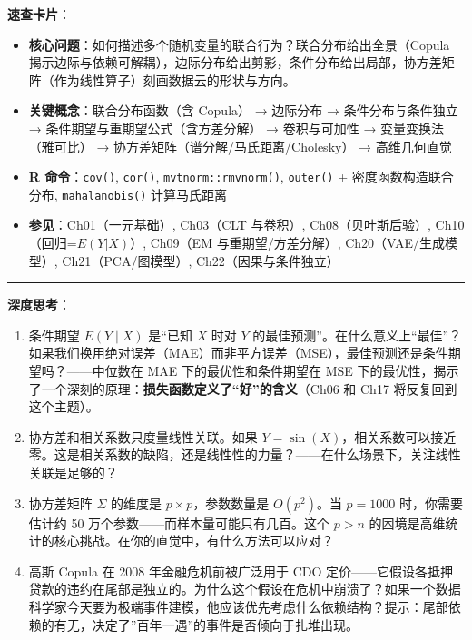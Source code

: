 \documentclass[
]{book}
\providecommand{\tightlist}{%
  \setlength{\itemsep}{0pt}\setlength{\parskip}{0pt}}
\begin{document}
\textbf{速查卡片}：

\begin{itemize}
\tightlist
\item
  \textbf{核心问题}：如何描述多个随机变量的联合行为？联合分布给出全景（Copula 揭示边际与依赖可解耦），边际分布给出剪影，条件分布给出局部，协方差矩阵（作为线性算子）刻画数据云的形状与方向。
\item
  \textbf{关键概念}：联合分布函数（含 Copula） → 边际分布 → 条件分布与条件独立 → 条件期望与重期望公式（含方差分解） → 卷积与可加性 → 变量变换法（雅可比） → 协方差矩阵（谱分解/马氏距离/Cholesky） → 高维几何直觉
\item
  \textbf{R 命令}：\texttt{cov()}, \texttt{cor()}, \texttt{mvtnorm::rmvnorm()}, \texttt{outer()} + 密度函数构造联合分布, \texttt{mahalanobis()} 计算马氏距离
\item
  \textbf{参见}：Ch01（一元基础）, Ch03（CLT 与卷积）, Ch08（贝叶斯后验）, Ch10（回归=\(E(Y|X)\)）, Ch09（EM 与重期望/方差分解）, Ch20（VAE/生成模型）, Ch21（PCA/图模型）, Ch22（因果与条件独立）
\end{itemize}

\begin{center}\rule{0.5\linewidth}{0.5pt}\end{center}

\textbf{深度思考}：

\begin{enumerate}
\def\labelenumi{\arabic{enumi}.}
\item
  条件期望 \(E(Y \mid X)\) 是``已知 \(X\) 时对 \(Y\) 的最佳预测''。在什么意义上``最佳''？如果我们换用绝对误差（MAE）而非平方误差（MSE），最佳预测还是条件期望吗？------中位数在 MAE 下的最优性和条件期望在 MSE 下的最优性，揭示了一个深刻的原理：\textbf{损失函数定义了``好''的含义}（Ch06 和 Ch17 将反复回到这个主题）。
\item
  协方差和相关系数只度量线性关联。如果 \(Y = \sin(X)\)，相关系数可以接近零。这是相关系数的缺陷，还是线性性的力量？------在什么场景下，关注线性关联是足够的？
\item
  协方差矩阵 \(\Sigma\) 的维度是 \(p \times p\)，参数数量是 \(O(p^2)\)。当 \(p = 1000\) 时，你需要估计约 50 万个参数------而样本量可能只有几百。这个 \(p > n\) 的困境是高维统计的核心挑战。在你的直觉中，有什么方法可以应对？
\item
  高斯 Copula 在 2008 年金融危机前被广泛用于 CDO 定价------它假设各抵押贷款的违约在尾部是独立的。为什么这个假设在危机中崩溃了？如果一个数据科学家今天要为极端事件建模，他应该优先考虑什么依赖结构？提示：尾部依赖的有无，决定了''百年一遇''的事件是否倾向于扎堆出现。
\end{enumerate}
\end{document}
